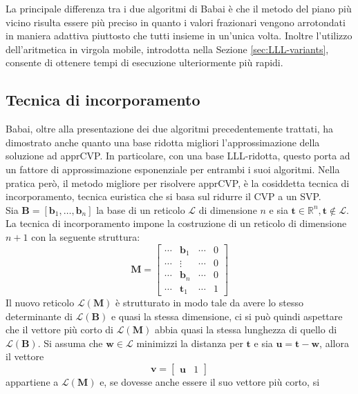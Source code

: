 La principale differenza tra i due algoritmi di Babai è che il metodo del piano più vicino
risulta essere più preciso in quanto i valori frazionari vengono arrotondati in maniera
adattiva piuttosto che tutti insieme in un'unica volta. Inoltre l'utilizzo dell'aritmetica in virgola mobile, 
introdotta nella Sezione \ref{sec:LLL-variants}, consente di ottenere tempi di esecuzione 
ulteriormente più rapidi.


\subsection{Tecnica di incorporamento}
\label{sec:embedding}
Babai, oltre alla presentazione dei due algoritmi precedentemente trattati, ha dimostrato
anche quanto una base ridotta migliori l'approssimazione della soluzione ad apprCVP.
In particolare, con una base LLL-ridotta, questo porta ad un fattore di approssimazione
esponenziale per entrambi i suoi algoritmi. Nella pratica però, il metodo migliore per 
risolvere apprCVP, è la cosiddetta tecnica di
incorporamento\cite{Galbraith18}, tecnica euristica che si basa sul ridurre il CVP a un SVP.  
\\
Sia $\mathbf{B} = [\mathbf{b}_1,\dots, \mathbf{b}_n]$ la base di un reticolo $\mathcal{L}$
di dimensione $n$ e sia $\mathbf{t} \in \mathbb{R}^n, \mathbf{t} \notin \mathcal{L}$. 
La tecnica di incorporamento impone la costruzione di un reticolo di dimensione $n+1$ con
la seguente struttura:
\[
    \mathbf{M} =
    \begin{bmatrix}
        \cdots & \mathbf{b}_1 & \cdots & 0\\
        \cdots & \vdots &  \cdots &  0\\
        \cdots & \mathbf{b}_n & \cdots & 0\\
        \cdots & \mathbf{t}_1 & \cdots & 1
    \end{bmatrix}
\]
Il nuovo reticolo $\mathcal{L}(\mathbf{M})$ è strutturato in modo tale da avere lo stesso 
determinante di $\mathcal{L}(\mathbf{B})$ e quasi la stessa dimensione, ci si può quindi 
aspettare che il vettore più corto di $\mathcal{L}(\mathbf{M})$ abbia quasi la stessa 
lunghezza di quello di $\mathcal{L}(\mathbf{B})$. Si assuma che $\mathbf{w} \in \mathcal{L}$
minimizzi la distanza per $\mathbf{t}$ e sia $\mathbf{u} = \mathbf{t}-\mathbf{w}$, allora il vettore
\[
    \mathbf{v} =
    \begin{bmatrix}
        \mathbf{u} & 1
    \end{bmatrix}
\]
appartiene a $\mathcal{L}(\mathbf{M})$ e, se dovesse anche essere il suo vettore più corto, si 
